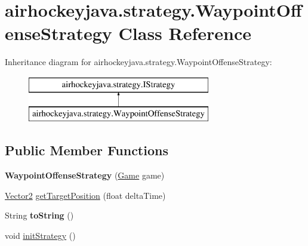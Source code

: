 \hypertarget{classairhockeyjava_1_1strategy_1_1_waypoint_offense_strategy}{}\section{airhockeyjava.\+strategy.\+Waypoint\+Offense\+Strategy Class Reference}
\label{classairhockeyjava_1_1strategy_1_1_waypoint_offense_strategy}
Inheritance diagram for airhockeyjava.\+strategy.\+Waypoint\+Offense\+Strategy\+:\begin{figure}[H]
\begin{center}
\leavevmode
\includegraphics[height=2.000000cm]{classairhockeyjava_1_1strategy_1_1_waypoint_offense_strategy}
\end{center}
\end{figure}
\subsection*{Public Member Functions}
\begin{DoxyCompactItemize}
\item 
\hypertarget{classairhockeyjava_1_1strategy_1_1_waypoint_offense_strategy_a5dd2d68a1e0113291b36a42ff24875a4}{}{\bfseries Waypoint\+Offense\+Strategy} (\hyperlink{classairhockeyjava_1_1game_1_1_game}{Game} game)\label{classairhockeyjava_1_1strategy_1_1_waypoint_offense_strategy_a5dd2d68a1e0113291b36a42ff24875a4}

\item 
\hyperlink{classairhockeyjava_1_1util_1_1_vector2}{Vector2} \hyperlink{classairhockeyjava_1_1strategy_1_1_waypoint_offense_strategy_a63b1e999e272ca5d7e577e74cc701503}{get\+Target\+Position} (float delta\+Time)
\item 
\hypertarget{classairhockeyjava_1_1strategy_1_1_waypoint_offense_strategy_a41e3543c3e6c52de78cf9fb970d56bcb}{}String {\bfseries to\+String} ()\label{classairhockeyjava_1_1strategy_1_1_waypoint_offense_strategy_a41e3543c3e6c52de78cf9fb970d56bcb}

\item 
void \hyperlink{classairhockeyjava_1_1strategy_1_1_waypoint_offense_strategy_a04eac2b8a2c2b9fcdcac0f6735f8785f}{init\+Strategy} ()
\end{DoxyCompactItemize}


